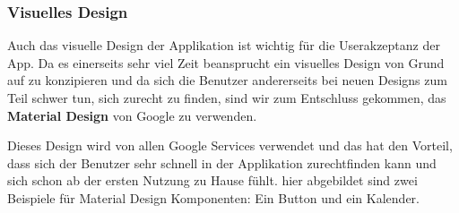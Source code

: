\subsubsection{Visuelles Design}
Auch das visuelle Design der Applikation ist wichtig für die Userakzeptanz der App. Da es einerseits sehr viel Zeit beansprucht ein visuelles Design von Grund auf zu konzipieren und da sich die Benutzer andererseits bei neuen Designs zum Teil schwer tun, sich zurecht zu finden, sind wir zum Entschluss gekommen, das \textbf{Material Design} von Google zu verwenden. 

Dieses Design wird von allen Google Services verwendet und das hat den Vorteil, dass sich der Benutzer sehr schnell in der Applikation zurechtfinden kann und sich schon ab der ersten Nutzung zu Hause fühlt. hier abgebildet sind zwei Beispiele für Material Design Komponenten: Ein Button und ein Kalender.

